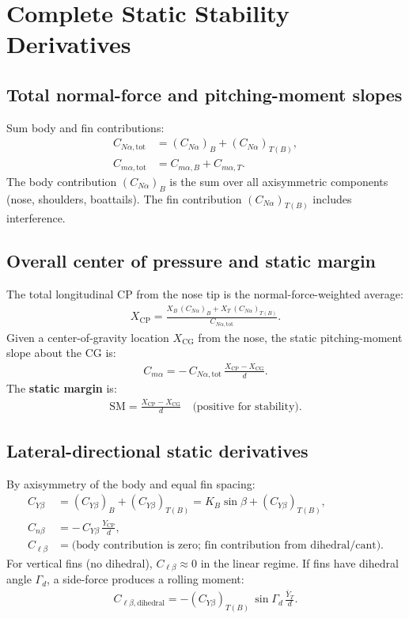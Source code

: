 \documentclass[11pt]{article}
\begin{document}
\section{Complete Static Stability Derivatives}

\subsection{Total normal-force and pitching-moment slopes}
Sum body and fin contributions:
\begin{align}
\label{eq:CNa_total}
C_{N\alpha,\text{tot}} &= (C_{N\alpha})_B + (C_{N\alpha})_{T(B)},\\
C_{m\alpha,\text{tot}} &= C_{m\alpha,B} + C_{m\alpha,T}.
\end{align}
The body contribution $(C_{N\alpha})_B$ is the sum over all axisymmetric components (nose, shoulders, boattails). The fin contribution $(C_{N\alpha})_{T(B)}$ includes interference.

\subsection{Overall center of pressure and static margin}
The total longitudinal CP from the nose tip is the normal-force-weighted average:
\begin{align}
\label{eq:Xcp_total}
X_{\text{CP}} = \frac{X_B\,(C_{N\alpha})_B + X_T\,(C_{N\alpha})_{T(B)}}{C_{N\alpha,\text{tot}}}.
\end{align}
Given a center-of-gravity location $X_{\text{CG}}$ from the nose, the static pitching-moment slope about the CG is:
\begin{align}
\label{eq:Cma_static}
C_{m\alpha} = -\,C_{N\alpha,\text{tot}}\,\frac{X_{\text{CP}}-X_{\text{CG}}}{d}.
\end{align}
The \textbf{static margin} is:
\begin{align}
\text{SM} = \frac{X_{\text{CP}}-X_{\text{CG}}}{d} \quad \text{(positive for stability)}.
\end{align}

\subsection{Lateral-directional static derivatives}
By axisymmetry of the body and equal fin spacing:
\begin{align}
C_{Y\beta} &= (C_{Y\beta})_B + (C_{Y\beta})_{T(B)} = K_B\sin\beta + (C_{Y\beta})_{T(B)},\\
C_{n\beta} &= -\,C_{Y\beta}\,\frac{Y_{\text{CP}}}{d},\\
C_{\ell\beta} &= \text{(body contribution is zero; fin contribution from dihedral/cant)}.
\end{align}
For vertical fins (no dihedral), $C_{\ell\beta}\approx 0$ in the linear regime. If fins have dihedral angle $\Gamma_d$, a side-force produces a rolling moment:
\begin{align}
C_{\ell\beta,\text{dihedral}} = -(C_{Y\beta})_{T(B)}\,\sin\Gamma_d\,\frac{\bar Y_T}{d}.
\end{align}
\end{document}
